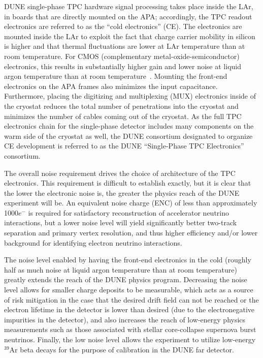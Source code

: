 DUNE single-phase TPC hardware signal processing takes place inside the LAr, in boards that are directly mounted on the APA; accordingly, the TPC readout electronics are referred to as the ``cold electronics'' (CE).  The electronics are mounted inside the LAr to exploit the fact that charge carrier mobility in silicon is higher and that thermal fluctuations are lower at LAr temperature than at room temperature.  For CMOS (complementary metal-oxide-semiconductor) electronics, this results in substantially higher gain and lower noise at liquid argon temperature than at room temperature~\cite{LArCMOS}.  Mounting the front-end electronics on the APA frames also minimizes the input capacitance.  Furthermore, placing the digitizing and multiplexing (MUX) electronics inside of the cryostat reduces the total number of penetrations into the cryostat and minimizes the number of cables coming out of the cryostat.  As the full TPC electronics chain for the single-phase detector includes many components on the warm side of the cryostat as well, the DUNE consortium designated to organize CE development is referred to as the DUNE ``Single-Phase TPC Electronics'' consortium.

The overall noise requirement drives the choice of architecture of the TPC electronics. This requirement is difficult to establish exactly, but it is clear that the lower the electronic noise is, the greater the physics reach of the DUNE experiment will be.  An equivalent noise charge (ENC) of less than approximately 1000$e^-$ is required for satisfactory reconstruction of accelerator neutrino interactions, but a lower noise level will yield significantly better two-track separation and primary vertex resolution, and thus higher efficiency and/or lower background for identifying electron neutrino interactions.

The noise level enabled by having the front-end electronics in the cold (roughly half as much noise at liquid argon temperature than at room temperature) greatly extends the reach of the DUNE physics program.  Decreasing the noise level allows for smaller charge deposits to be measurable, which acts as a source of risk mitigation in the case that the desired drift field can not be reached or the electron lifetime in the detector is lower than desired (due to the electronegative impurities in the detector), and also increases the reach of low-energy physics measurements such as those associated with stellar core-collapse supernova burst neutrinos.  Finally, the low noise level allows the experiment to utilize low-energy $\mathrm{{}^{39}Ar}$ beta decays for the purpose of calibration in the DUNE far detector.

